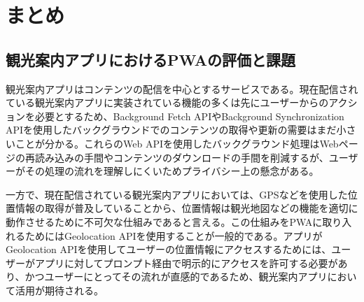 \section{まとめ}\label{section:まとめ}
\subsection{観光案内アプリにおけるPWAの評価と課題}\label{subsection:観光案内アプリにおけるPWAの評価と課題}
観光案内アプリはコンテンツの配信を中心とするサービスである。現在配信されている観光案内アプリに実装されている機能の多くは先にユーザーからのアクションを必要とするため、Background Fetch APIやBackground Synchronization APIを使用したバックグラウンドでのコンテンツの取得や更新の需要はまだ小さいことが分かる。これらのWeb APIを使用したバックグラウンド処理はWebページの再読み込みの手間やコンテンツのダウンロードの手間を削減するが、ユーザーがその処理の流れを理解しにくいためプライバシー上の懸念がある。

一方で、現在配信されている観光案内アプリにおいては、GPSなどを使用した位置情報の取得が普及していることから、位置情報は観光地図などの機能を適切に動作させるために不可欠な仕組みであると言える。この仕組みをPWAに取り入れるためにはGeolocation APIを使用することが一般的である。アプリがGeolocation APIを使用してユーザーの位置情報にアクセスするためには、ユーザーがアプリに対してプロンプト経由で明示的にアクセスを許可する必要があり、かつユーザーにとってその流れが直感的であるため、観光案内アプリにおいて活用が期待される。

